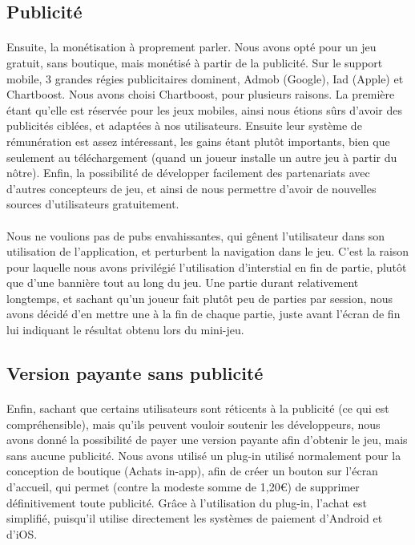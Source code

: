 \subsection{Publicité}

\paragraph{}Ensuite, la monétisation à proprement parler. Nous avons opté pour un jeu gratuit, sans boutique, mais monétisé à partir de la publicité. Sur le support mobile, 3 grandes régies publicitaires dominent, Admob (Google), Iad (Apple) et Chartboost. Nous avons choisi Chartboost, pour plusieurs raisons. La première étant qu'elle est réservée pour les jeux mobiles, ainsi nous étions sûrs d'avoir des publicités ciblées, et adaptées à nos utilisateurs. Ensuite leur système de rémunération est assez intéressant, les gains étant plutôt importants, bien que seulement au téléchargement (quand un joueur installe un autre jeu à partir du nôtre). Enfin, la possibilité de développer facilement des partenariats avec d'autres concepteurs de jeu, et ainsi de nous permettre d'avoir de nouvelles sources d'utilisateurs gratuitement. 
\paragraph{}
Nous ne voulions pas de pubs envahissantes, qui gênent l'utilisateur dans son utilisation de l'application, et perturbent la navigation dans le jeu. C'est la raison pour laquelle nous avons privilégié l'utilisation d'interstial en fin de partie, plutôt que d'une bannière tout au long du jeu. Une partie durant relativement longtemps, et sachant qu'un joueur fait plutôt peu de parties par session, nous avons décidé d'en mettre une à la fin de chaque partie, juste avant l'écran de fin lui indiquant le résultat obtenu lors du mini-jeu.

\subsection{Version payante sans publicité}

\paragraph{}
Enfin, sachant que certains utilisateurs sont réticents à la publicité (ce qui est compréhensible), mais qu'ils peuvent vouloir soutenir les développeurs, nous avons donné la possibilité de payer une version payante afin d'obtenir le jeu, mais sans aucune publicité. Nous avons utilisé un plug-in utilisé normalement pour la conception de boutique (Achats in-app), afin de créer un bouton sur l'écran d'accueil, qui permet (contre la modeste somme de 1,20\euro) de supprimer définitivement toute publicité. Grâce à l'utilisation du plug-in, l'achat est simplifié, puisqu'il utilise directement les systèmes de paiement d'Android et d'iOS.  
